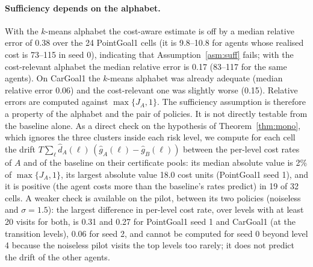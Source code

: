 \documentclass{article}
\begin{document}
\paragraph{Sufficiency depends on the alphabet.} With the $k$-means alphabet the cost-aware estimate is off by a median relative error of 0.38 over the 24 PointGoal1 cells (it is 9.8--10.8 for agents whose realised cost is 73--115 in seed 0), indicating that Assumption~\ref{asm:suff} fails; with the cost-relevant alphabet the median relative error is 0.17 (83--117 for the same agents). On CarGoal1 the $k$-means alphabet was already adequate (median relative error 0.06) and the cost-relevant one was slightly worse (0.15). Relative errors are computed against $\max\{J_A,1\}$. The sufficiency assumption is therefore a property of the alphabet and the pair of policies. It is not directly testable from the baseline alone. As a direct check on the hypothesis of Theorem~\ref{thm:mono}, which ignores the three clusters inside each risk level, we compute for each cell the drift $T\sum_\ell\hat d_A(\ell)\,(\hat g_A(\ell)-\hat g_B(\ell))$ between the per-level cost rates of $A$ and of the baseline on their certificate pools: its median absolute value is 2\% of $\max\{J_A,1\}$, its largest absolute value 18.0 cost units (PointGoal1 seed 1), and it is positive (the agent costs more than the baseline's rates predict) in 19 of 32 cells. A weaker check is available on the pilot, between its two policies (noiseless and $\sigma=1.5$): the largest difference in per-level cost rate, over levels with at least 20 visits for both, is 0.31 and 0.27 for PointGoal1 seed 1 and CarGoal1 (at the transition levels), 0.06 for seed 2, and cannot be computed for seed 0 beyond level 4 because the noiseless pilot visits the top levels too rarely; it does not predict the drift of the other agents.
\end{document}
